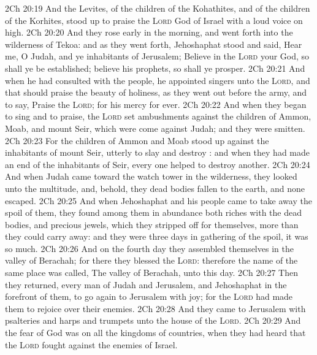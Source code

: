 \vs 2Ch 20:19 And the Levites, of the children of the Kohathites, and of the children of the Korhites, stood up to praise the \textsc{Lord} God of Israel with a loud voice on high.
\vs 2Ch 20:20 And they rose early in the morning, and went forth into the wilderness of Tekoa: and as they went forth, Jehoshaphat stood and said, Hear me, O Judah, and ye inhabitants of Jerusalem; Believe in the \textsc{Lord} your God, so shall ye be established; believe his prophets, so shall ye prosper.
\vs 2Ch 20:21 And when he had consulted with the people, he appointed singers unto the \textsc{Lord}, and that should praise the beauty of holiness, as they went out before the army, and to say, Praise the \textsc{Lord}; for his mercy  for ever.
\vs 2Ch 20:22 And when they began to sing and to praise, the \textsc{Lord} set ambushments against the children of Ammon, Moab, and mount Seir, which were come against Judah; and they were smitten.
\vs 2Ch 20:23 For the children of Ammon and Moab stood up against the inhabitants of mount Seir, utterly to slay and destroy : and when they had made an end of the inhabitants of Seir, every one helped to destroy another.
\vs 2Ch 20:24 And when Judah came toward the watch tower in the wilderness, they looked unto the multitude, and, behold, they  dead bodies fallen to the earth, and none escaped.
\vs 2Ch 20:25 And when Jehoshaphat and his people came to take away the spoil of them, they found among them in abundance both riches with the dead bodies, and precious jewels, which they stripped off for themselves, more than they could carry away: and they were three days in gathering of the spoil, it was so much.
\vs 2Ch 20:26 And on the fourth day they assembled themselves in the valley of Berachah; for there they blessed the \textsc{Lord}: therefore the name of the same place was called, The valley of Berachah, unto this day.
\vs 2Ch 20:27 Then they returned, every man of Judah and Jerusalem, and Jehoshaphat in the forefront of them, to go again to Jerusalem with joy; for the \textsc{Lord} had made them to rejoice over their enemies.
\vs 2Ch 20:28 And they came to Jerusalem with psalteries and harps and trumpets unto the house of the \textsc{Lord}.
\vs 2Ch 20:29 And the fear of God was on all the kingdoms of  countries, when they had heard that the \textsc{Lord} fought against the enemies of Israel.
